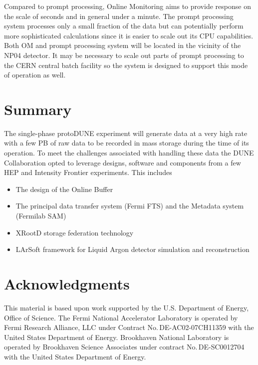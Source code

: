 \documentclass[a4paper]{jpconf}
\newcommand{\pd}{protoDUNE\xspace}
\begin{document}
Compared to prompt processing, Online Monitoring aims
to provide response on the scale of seconds and in general under a minute.
The prompt processing system processes only a small fraction of the data
but can potentially perform more sophisticated calculations since it is
easier to scale out its CPU capabilities. Both OM and prompt processing system
will be located in the vicinity of the NP04 detector. It may be necessary to
scale out parts of prompt processing to the CERN central batch facility
so the system is designed to support this mode of operation as well.

\section{Summary}
The single-phase \pd experiment will generate data at a very high rate
with a few PB of raw data to be recorded in mass storage during the time of
its operation. To meet the challenges associated with handling these
data the DUNE Collaboration opted to leverage designs, software and
components from a few HEP and Intensity Frontier experiments. This includes
\begin{itemize}
\item The design of the Online Buffer
\item The principal data transfer system (Fermi FTS) and the Metadata system (Fermilab SAM)
\item XRootD storage federation technology
\item LArSoft framework for Liquid Argon detector simulation and reconstruction
\end{itemize}

\section*{Acknowledgments}
This material is based upon work supported by the U.S. Department of Energy, Office of Science.
The Fermi National Accelerator Laboratory is operated by Fermi Research Alliance, LLC
under Contract No.\,DE-AC02-07CH11359 with the United States Department of Energy.
Brookhaven National Laboratory is operated by Brookhaven Science Associates
under contract No.\,DE-SC0012704 with the United States Department of Energy.
\end{document}
